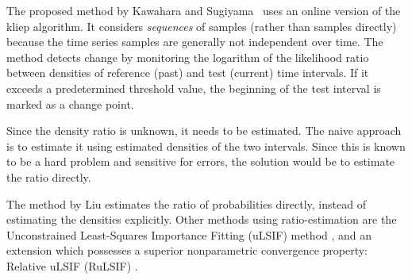 The proposed method by Kawahara and Sugiyama~\cite{kawahara2009change} uses an online version of the \gls{kliep} algorithm.
It considers \emph{sequences} of samples (rather than samples directly) because the time series samples are generally not independent over time.
The method detects change by monitoring the logarithm of the likelihood ratio between densities of reference (past) and test (current) time intervals.
If it exceeds a predetermined threshold value, the beginning of the test interval is marked as a change point.

Since the density ratio is unknown, it needs to be estimated.
The naive approach is to estimate it using estimated densities of the two intervals.
Since this is known to be a hard problem and sensitive for errors, the solution would be to estimate the ratio directly.

The method by Liu \etal \cite{liu2013change} estimates the ratio of probabilities directly, instead of estimating the densities explicitly.
Other methods using ratio-estimation are the Unconstrained Least-Squares Importance Fitting (uLSIF) method \cite{kanamori2009least}, and an extension which possesses a superior nonparametric convergence property: Relative uLSIF (RuLSIF) \cite{yamada2013relative}.